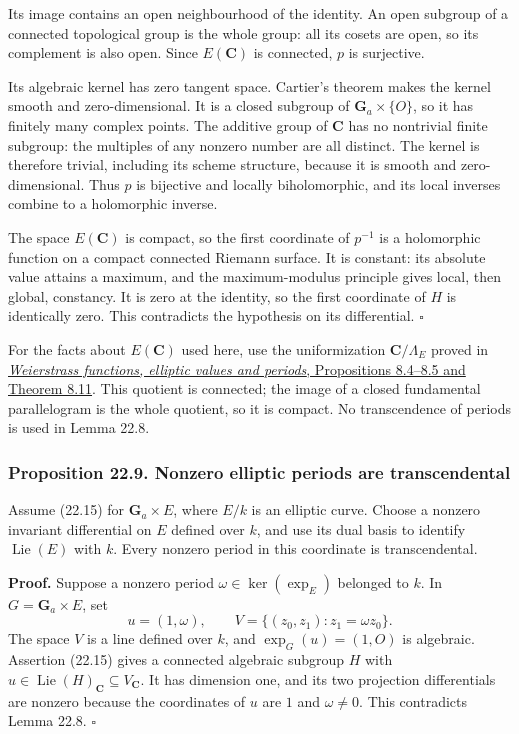 \documentclass[
  11pt,
  a4paper,
]{article}
\begin{document}
Its image contains an open neighbourhood of the identity. An open
subgroup of a connected topological group is the whole group: all its
cosets are open, so its complement is also open. Since \(E(\mathbf C)\)
is connected, \(p\) is surjective.

Its algebraic kernel has zero tangent space. Cartier's theorem makes the
kernel smooth and zero-dimensional. It is a closed subgroup of
\(\mathbf G_a\times\{O\}\), so it has finitely many complex points. The
additive group of \(\mathbf C\) has no nontrivial finite subgroup: the
multiples of any nonzero number are all distinct. The kernel is
therefore trivial, including its scheme structure, because it is smooth
and zero-dimensional. Thus \(p\) is bijective and locally biholomorphic,
and its local inverses combine to a holomorphic inverse.

The space \(E(\mathbf C)\) is compact, so the first coordinate of
\(p^{-1}\) is a holomorphic function on a compact connected Riemann
surface. It is constant: its absolute value attains a maximum, and the
maximum-modulus principle gives local, then global, constancy. It is
zero at the identity, so the first coordinate of \(H\) is identically
zero. This contradicts the hypothesis on its differential. \(\square\)

For the facts about \(E(\mathbf C)\) used here, use the uniformization
\(\mathbf C/\Lambda_E\) proved in
\href{https://kokunoyumeto.github.io/open-math-courses-public/courses/TR-TRANS/TR-TRANS-08.html\#5-a-lattice-for-every-nonsingular-cubic}{\emph{Weierstrass
functions, elliptic values and periods}, Propositions 8.4--8.5 and
Theorem 8.11}. This quotient is connected; the image of a closed
fundamental parallelogram is the whole quotient, so it is compact. No
transcendence of periods is used in Lemma 22.8.

\subsubsection{Proposition 22.9. Nonzero elliptic periods are
transcendental}\label{proposition-22.9.-nonzero-elliptic-periods-are-transcendental}

Assume (22.15) for \(\mathbf G_a\times E\), where \(E/k\) is an elliptic
curve. Choose a nonzero invariant differential on \(E\) defined over
\(k\), and use its dual basis to identify \(\operatorname{Lie}(E)\) with
\(k\). Every nonzero period in this coordinate is transcendental.

\textbf{Proof.} Suppose a nonzero period \(\omega\in\ker(\exp_E)\)
belonged to \(k\). In \(G=\mathbf G_a\times E\), set \[
 u=(1,\omega),\qquad
 V=\{(z_0,z_1):z_1=\omega z_0\}.
 \tag{22.17}
\] The space \(V\) is a line defined over \(k\), and \(\exp_G(u)=(1,O)\)
is algebraic. Assertion (22.15) gives a connected algebraic subgroup
\(H\) with
\(u\in\operatorname{Lie}(H)_{\mathbf C}\subseteq V_{\mathbf C}\). It has
dimension one, and its two projection differentials are nonzero because
the coordinates of \(u\) are \(1\) and \(\omega\ne0\). This contradicts
Lemma 22.8. \(\square\)
\end{document}

